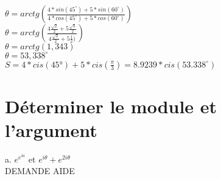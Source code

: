 $\theta = arctg(\frac{4 * sin(45^{\circ}) + 5 * sin(60^{\circ})} {4 * cos(45^{\circ}) + 5 * cos(60^{\circ})})$ \\

$\theta = arctg(\frac{4\frac{\sqrt{2}} {2} + 5\frac{\sqrt{3}} {2}} {4\frac{\sqrt{2}} {2} + 5\frac{1} {2})})$ \\

$\theta = arctg(1,343)$ \\

$\theta = 53,338^{\circ}$ \\

$ S = 4*cis(45°) + 5*cis(\frac{\pi}{3}) = 8.9239 * cis(53.338^{\circ})$ \\

\section{Déterminer le module et l'argument}

a. $e^{e^{ia}}$  et $e^{i\theta} + e^{2i\theta} $ \\

DEMANDE AIDE \\
